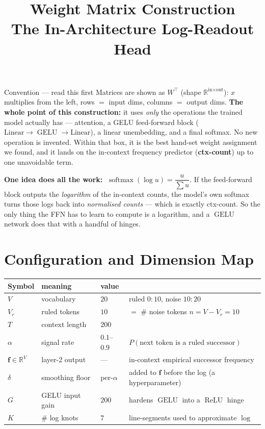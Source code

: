 \documentclass[11pt]{article}
\title{\textbf{Weight Matrix Construction\\[2pt]\large The In-Architecture Log-Readout Head}}
\author{}\date{}
\newcommand{\R}{\mathbb{R}}
\newcommand{\T}{^{\!\top}}
\newcommand{\fvec}{\mathbf{f}}
\newcommand{\relu}{\operatorname{ReLU}}
\newcommand{\gelu}{\operatorname{GELU}}
\newcommand{\sm}{\operatorname{softmax}}
\begin{document}
\maketitle
\vspace{-3.2em}

\begin{convbox}{Convention --- read this first}
Matrices are shown as $W\T$ (shape $\R^{\text{in}\times\text{out}}$): $x$ multiplies from the left, rows
$=$ input dims, columns $=$ output dims. \textbf{The whole point of this construction:} it uses
\emph{only} the operations the trained model actually has --- attention, a GELU feed-forward block
($\text{Linear}\!\to\!\gelu\!\to\!\text{Linear}$), a linear unembedding, and a final softmax. No new
operation is invented. Within that box, it is the best hand-set weight assignment we found, and it
lands on the in-context frequency predictor (\textbf{ctx-count}) up to one unavoidable term.

\smallskip
\textbf{One idea does all the work:} $\;\sm(\log u)=\dfrac{u}{\sum u}$. If the feed-forward block
outputs the \emph{logarithm} of the in-context counts, the model's own softmax turns those logs back
into \emph{normalised counts} --- which is exactly ctx-count. So the only thing the FFN has to learn
to compute is a logarithm, and a $\gelu$ network does that with a handful of hinges.
\end{convbox}

\tableofcontents
\newpage

\section{Configuration and Dimension Map}
\begin{center}\small
\begin{tabular}{@{}llll@{}}
\toprule
Symbol & meaning & value & \\
\midrule
$V$ & vocabulary & $20$ & ruled $0{:}10$, noise $10{:}20$\\
$V_r$ & ruled tokens & $10$ & $=$ \# noise tokens $n=V-V_r=10$\\
$T$ & context length & $200$ &\\
$\alpha$ & signal rate & $0.1$–$0.9$ & $P(\text{next token is a ruled successor})$\\
$\fvec\in\R^{V}$ & layer-2 output & --- & in-context empirical successor frequency\\
$\delta$ & smoothing floor & per-$\alpha$ & added to $\fvec$ before the log (a hyperparameter)\\
$G$ & GELU input gain & $200$ & hardens $\gelu$ into a $\relu$ hinge\\
$K$ & \# log knots & $7$ & line-segments used to approximate $\log$\\
\bottomrule
\end{tabular}
\end{center}
\end{document}
